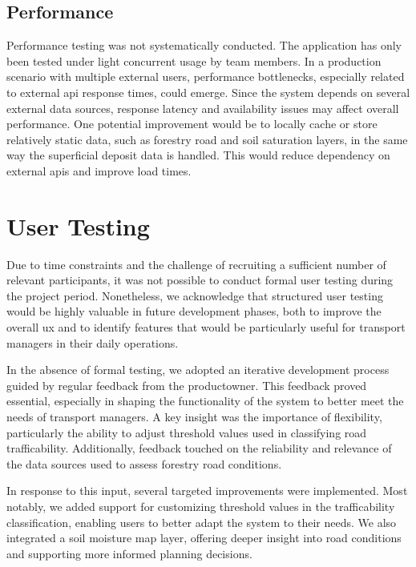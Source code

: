 \subsection{Performance}

Performance testing was not systematically conducted. The application has only been tested under light concurrent usage by team members. In a production scenario with multiple external users, performance bottlenecks, especially related to external \acrshort{api} response times, could emerge. Since the system depends on several external data sources, response latency and availability issues may affect overall performance. One potential improvement would be to locally cache or store relatively static data, such as forestry road and soil saturation layers, in the same way the superficial deposit data is handled. This would reduce dependency on external \acrshort{api}s and improve load times.

\section{User Testing}\label{sec:quality_assurance_user_feedback:user_testing}

Due to time constraints and the challenge of recruiting a sufficient number of relevant participants, it was not possible to conduct formal user testing during the project period. Nonetheless, we acknowledge that structured user testing would be highly valuable in future development phases, both to improve the overall \acrfull{ux} and to identify features that would be particularly useful for transport managers in their daily operations.

In the absence of formal testing, we adopted an iterative development process guided by regular feedback from the \gls{productowner}. This feedback proved essential, especially in shaping the functionality of the system to better meet the needs of transport managers. A key insight was the importance of flexibility, particularly the ability to adjust threshold values used in classifying road trafficability. Additionally, feedback touched on the reliability and relevance of the data sources used to assess forestry road conditions.

In response to this input, several targeted improvements were implemented. Most notably, we added support for customizing threshold values in the trafficability classification, enabling users to better adapt the system to their needs. We also integrated a soil moisture map layer, offering deeper insight into road conditions and supporting more informed planning decisions.

